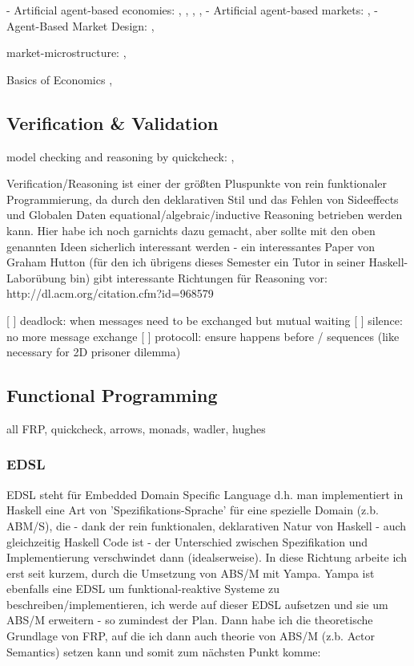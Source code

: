 - Artificial agent-based economies: \cite{tesfatsion_agent-based_2006}, \cite{gintis_emergence_2006}, \cite{gintis_dynamics_2007}, \cite{gaffeo_adaptive_2008}, \cite{botta_functional_2011}
- Artificial agent-based markets: \cite{mackie-mason_chapter_2006}, \cite{darley_nasdaq_2007}
- Agent-Based Market Design: \cite{marks_chapter_2006}, \cite{budish_editors_2015}

market-microstructure: \cite{LehalleLaruelle2013}, \cite{baker_market_2013}

Basics of Economics \cite{bowles_understanding_2005}, \cite{kirman_complex_2010}

\subsection{Verification \& Validation}
model checking and reasoning by quickcheck: \cite{claessen_quickcheck:_2000}, \cite{hutton_tutorial_1999}

Verification/Reasoning ist einer der größten Pluspunkte von rein funktionaler Programmierung, da durch den deklarativen Stil und das Fehlen von Sideeffects und Globalen Daten equational/algebraic/inductive Reasoning betrieben werden kann. Hier habe ich noch garnichts dazu gemacht, aber sollte mit den oben genannten Ideen sicherlich interessant werden - ein interessantes Paper von Graham Hutton (für den ich übrigens dieses Semester ein Tutor in seiner Haskell-Laborübung bin) gibt interessante Richtungen für Reasoning vor: http://dl.acm.org/citation.cfm?id=968579

[ ] deadlock: when messages need to be exchanged but mutual waiting
[ ] silence: no more message exchange
[ ] protocoll: ensure happens before / sequences (like necessary for 2D prisoner dilemma)

\subsection{Functional Programming}
all FRP, quickcheck, arrows, monads, wadler, hughes

\subsubsection{EDSL}
EDSL steht für Embedded Domain Specific Language d.h. man implementiert in Haskell eine Art von 'Spezifikations-Sprache' für eine spezielle Domain (z.b. ABM/S), die - dank der rein funktionalen, deklarativen Natur von Haskell - auch gleichzeitig Haskell Code ist - der Unterschied zwischen Spezifikation und Implementierung verschwindet dann (idealserweise). In diese Richtung arbeite ich erst seit kurzem, durch die Umsetzung von ABS/M mit Yampa. Yampa ist ebenfalls eine EDSL um funktional-reaktive Systeme zu beschreiben/implementieren, ich werde auf dieser EDSL aufsetzen und sie um ABS/M erweitern - so zumindest der Plan. Dann habe ich die theoretische Grundlage von FRP, auf die ich dann auch theorie von ABS/M (z.b. Actor Semantics) setzen kann und somit zum nächsten Punkt komme:

